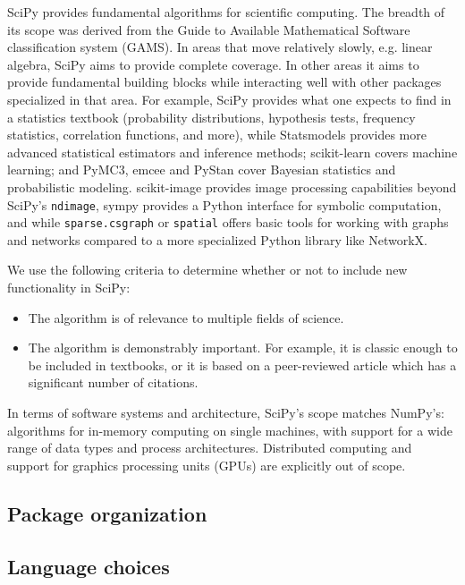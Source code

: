 \documentclass[fleqn,10pt]{wlscirep}
\begin{document}
SciPy provides fundamental algorithms for scientific computing. The
breadth of its scope was derived from the Guide to Available Mathematical
Software classification system (GAMS\cite{boisvert1991guide}). In areas
that move relatively slowly, e.g. linear algebra, SciPy aims to provide
complete coverage. In other areas it aims to provide fundamental building
blocks while interacting well with other packages specialized in that area.
For example, SciPy provides what one expects to find in a
statistics textbook (probability distributions, hypothesis tests, frequency
statistics, correlation functions, and more), while 
Statsmodels\cite{statsmodels2010} provides
more advanced statistical estimators and inference methods;
scikit-learn\cite{pedregosa2011scikit} covers machine learning; and
PyMC3\cite{10.7717/peerj-cs.55}, emcee\cite{2013PASP-emcee} and 
PyStan\cite{pystan-ref} cover Bayesian statistics and probabilistic modeling.
scikit-image\cite{vanderwalt2014scikit} provides image processing
capabilities beyond SciPy's \texttt{ndimage}, sympy\cite{meurer2017sympy}
provides a Python interface for symbolic computation, and
while \texttt{sparse.csgraph} or \texttt{spatial} offers basic tools
for working with graphs and networks compared to a more specialized
Python library like NetworkX\cite{hagberg2008networkx}.

We use the following criteria to determine whether or not to include new
functionality in SciPy:
\begin{itemize}
    \item The algorithm is of relevance to multiple fields of science.
    \item The algorithm is demonstrably important.  For example, it is classic
    enough to be included in textbooks, or it is based on a peer-reviewed article
    which has a significant number of citations.
\end{itemize}

In terms of software systems and architecture, SciPy's scope matches NumPy's:
algorithms for in-memory computing on single machines, with support for a wide
range of data types and process architectures. Distributed computing and support
for graphics processing units (GPUs) are explicitly out of scope.

\subsection*{Package organization}


\subsection*{Language choices}
\end{document}
